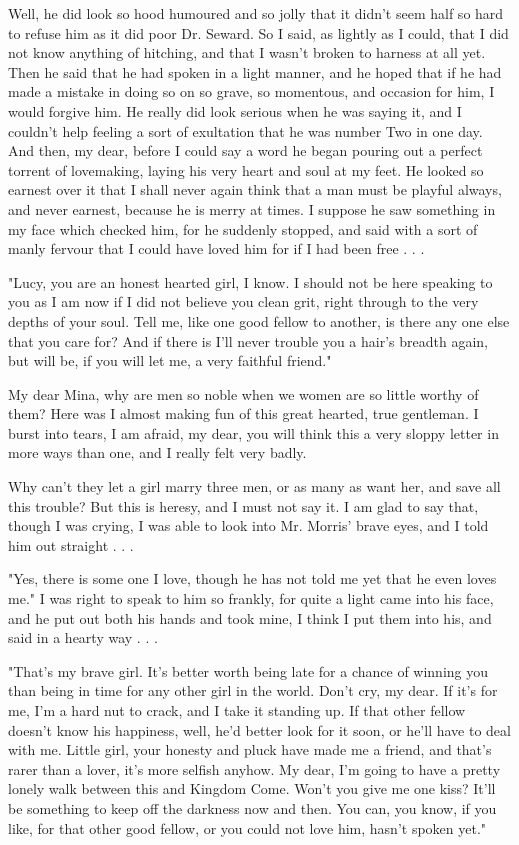 Well, he did look so hood humoured and so jolly that it didn't seem half so hard to refuse him as it did poor Dr. Seward. So I said, as lightly as I could, that I did not know anything of hitching, and that I wasn't broken to harness at all yet. Then he said that he had spoken in a light manner, and he hoped that if he had made a mistake in doing so on so grave, so momentous, and occasion for him, I would forgive him. He really did look serious when he was saying it, and I couldn't help feeling a sort of exultation that he was number Two in one day. And then, my dear, before I could say a word he began pouring out a perfect torrent of lovemaking, laying his very heart and soul at my feet. He looked so earnest over it that I shall never again think that a man must be playful always, and never earnest, because he is merry at times. I suppose he saw something in my face which checked him, for he suddenly stopped, and said with a sort of manly fervour that I could have loved him for if I had been free . . . 

"Lucy, you are an honest hearted girl, I know. I should not be here speaking to you as I am now if I did not believe you clean grit, right through to the very depths of your soul. Tell me, like one good fellow to another, is there any one else that you care for? And if there is I'll never trouble you a hair's breadth again, but will be, if you will let me, a very faithful friend." 

My dear Mina, why are men so noble when we women are so little worthy of them? Here was I almost making fun of this great hearted, true gentleman. I burst into tears, I am afraid, my dear, you will think this a very sloppy letter in more ways than one, and I really felt very badly. 

Why can't they let a girl marry three men, or as many as want her, and save all this trouble? But this is heresy, and I must not say it. I am glad to say that, though I was crying, I was able to look into Mr. Morris' brave eyes, and I told him out straight . . . 

"Yes, there is some one I love, though he has not told me yet that he even loves me." I was right to speak to him so frankly, for quite a light came into his face, and he put out both his hands and took mine, I think I put them into his, and said in a hearty way . . . 

"That's my brave girl. It's better worth being late for a chance of winning you than being in time for any other girl in the world. Don't cry, my dear. If it's for me, I'm a hard nut to crack, and I take it standing up. If that other fellow doesn't know his happiness, well, he'd better look for it soon, or he'll have to deal with me. Little girl, your honesty and pluck have made me a friend, and that's rarer than a lover, it's more selfish anyhow. My dear, I'm going to have a pretty lonely walk between this and Kingdom Come. Won't you give me one kiss? It'll be something to keep off the darkness now and then. You can, you know, if you like, for that other good fellow, or you could not love him, hasn't spoken yet." 

